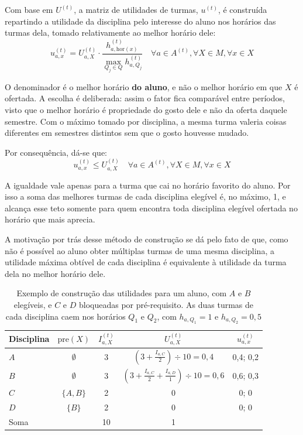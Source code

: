 \documentclass[
    12pt,
    openany,
    oneside,
    a4paper,
    english,
    brazil
]{abntex2}
\begin{document}
Com base em $U^{(t)}$, a matriz de utilidades de turmas, $u^{(t)}$, é construída repartindo a utilidade da disciplina pelo interesse do aluno nos horários das turmas dela, tomado relativamente ao melhor horário dele:
\begin{equation}
    u_{a, x}^{(t)} = U_{a, X}^{(t)} \cdot \frac{h_{a, \mathrm{hor}(x)}^{(t)}}{\max_{Q_j \in Q} h_{a, Q_j}^{(t)}}
    \quad \forall a \in A^{(t)}, \forall X \in M, \forall x \in X
\end{equation}

O denominador é o melhor horário \textbf{do aluno}, e não o melhor horário em que $X$ é ofertada. A escolha é deliberada: assim o fator fica comparável entre períodos, visto que o melhor horário é propriedade do gosto dele e não da oferta daquele semestre. Com o máximo tomado por disciplina, a mesma turma valeria coisas diferentes em semestres distintos sem que o gosto houvesse mudado.

Por consequência, dá-se que:
\begin{equation}
    u_{a, x}^{(t)} \leq U_{a, X}^{(t)}
    \quad \forall a \in A^{(t)}, \forall X \in M, \forall x \in X
\end{equation}

A igualdade vale apenas para a turma que cai no horário favorito do aluno. Por isso a soma das melhores turmas de cada disciplina elegível é, no máximo, 1, e alcança esse teto somente para quem encontra toda disciplina elegível ofertada no horário que mais aprecia.

A motivação por trás desse método de construção se dá pelo fato de que, como não é possível ao aluno obter múltiplas turmas de uma mesma disciplina, a utilidade máxima obtível de cada disciplina é equivalente à utilidade da turma dela no melhor horário dele.

\begin{table}[htbp]
\centering
\caption{Exemplo de construção das utilidades para um aluno, com $A$ e $B$ elegíveis, e $C$ e $D$ bloqueadas por pré-requisito. As duas turmas de cada disciplina caem nos horários $Q_1$ e $Q_2$, com $h_{a, Q_1} = 1$ e $h_{a, Q_2} = 0{,}5$}
\label{tab:exemplo-utilidade}
\begin{tabular}{lcccc}
\toprule
\textbf{Disciplina} & $\mathrm{pre}(X)$ & $I_{a, X}^{(t)}$ &  $U_{a, X}^{(t)}$ & $u_{a, x}^{(t)}$ \\
\midrule
$A$ & $\emptyset$ & 3 & $\left(3 + \frac{I_{a, C}}{2} \right)\div 10 = 0,4$ & 0,4; 0,2 \\
$B$ & $\emptyset$ & 3 & $\left(3 + \frac{I_{a, C}}{2} + \frac{I_{a, D}}{1}\right) \div 10 = 0,6$ & 0,6; 0,3 \\
$C$ & $\{A, B\}$  & 2 & 0 & 0; 0 \\
$D$ & $\{B\}$     & 2 & 0 & 0; 0 \\
\midrule
Soma & & 10 & 1 & \\
\bottomrule
\end{tabular}
\end{table}
\end{document}
